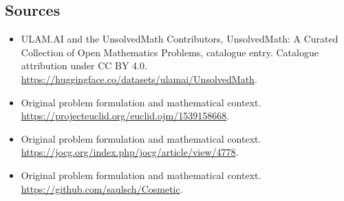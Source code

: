 \documentclass[11pt]{article}
\begin{document}
\subsection{Sources}
\begin{itemize}
\item[\hypertarget{source:statement:1}{S1}] ULAM.AI and the UnsolvedMath Contributors, UnsolvedMath: A Curated Collection of Open Mathematics Problems, catalogue entry. Catalogue attribution under CC BY 4.0.
\url{https://huggingface.co/datasets/ulamai/UnsolvedMath}.
\item[\hypertarget{source:statement:2}{S2}] Original problem formulation and mathematical context.
\url{https://projecteuclid.org/euclid.ojm/1539158668}.
\item[\hypertarget{source:statement:3}{S3}] Original problem formulation and mathematical context.
\url{https://jocg.org/index.php/jocg/article/view/4778}.
\item[\hypertarget{source:statement:4}{S4}] Original problem formulation and mathematical context.
\url{https://github.com/saulsch/Cosmetic}.
\end{itemize}
\label{end:statement}
\end{document}
